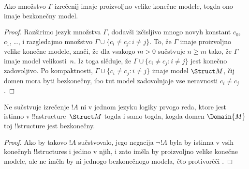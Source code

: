 \documentclass[../../../include/open-logic-section]{subfiles}
\begin{document}

\begin{thm}
 Ako množstvo $\Gamma$ izrečenij imaje proizvoljno
velike konečne modele, togda ono imaje bezkonečny model.
\end{thm}

\begin{proof}
Razširimo jezyk množstva $\Gamma$, dodavši izčisljivo mnogo novyh
konstant $c_0$, $c_1$, \dots, i razgledajmo množstvo $\Gamma \cup
\{c_i \neq c_j : i \neq j\}$. To, že $\Gamma$ imaje proizvoljno
velike konečne modele, znači, že dla vsakogo $m >0$ sučstvuje $n\ge
m$ tako, že $\Gamma$ imaje model velikosti~$n$. Iz toga slěduje, že
$\Gamma \cup \{c_i \neq c_j : i \neq j\}$ jest konečno zadovoljivo.
Po kompaktnosti, $\Gamma \cup \{c_i \neq c_j : i \neq j\}$ imaje
model $\Struct M$, čij domen mora byti bezkonečny, ibo tut model
zadovolnjaje vse neravnosti $c_i \neq c_j$.
\end{proof}

\begin{prop}
Ne sučstvuje izrečenje $!A$ ni v jednom jezyku logiky prvogo reda,
ktore jest istinno v !!a{structure}~$\Struct M$ togda i samo togda,
kogda domen $\Domain{M}$ toj !!{structure} jest bezkonečny.
\end{prop}

\begin{proof}
Ako by takovo $!A$ sučstvovalo, jego negacija $\lnot !A$ byla by
istinna v vsih konečnyh !!{structure}s i jedino v njih, i zato iměla by
proizvoljno velike konečne modele, ale ne iměla by ni jednogo
bezkonečnogo modela, čto protivorěči .
\end{proof}
\end{document}
